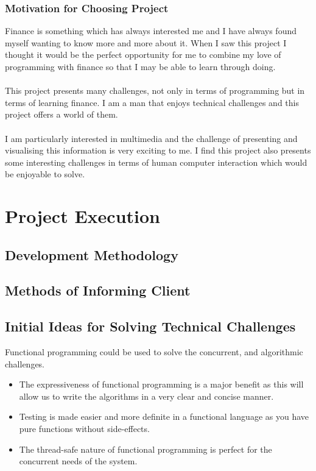 \documentclass{article}
\begin{document}
		\subsubsection{Motivation for Choosing Project}
		Finance is something which has always interested me and I have always found myself wanting to know more and more about it. When I saw this project I thought it would be the perfect opportunity for me to combine my love of programming with finance so that I may be able to learn through doing.\\\\
		This project presents many challenges, not only in terms of programming but in terms of learning finance. I am a man that enjoys technical challenges and this project offers a world of them.\\\\
		I am particularly interested in multimedia and the challenge of presenting and visualising this information is very exciting to me. I find this project also presents some interesting challenges in terms of human computer interaction which would be enjoyable to solve.

\cleardoublepage
    
\section{Project Execution}
	\subsection{Development Methodology}
	
	\subsection{Methods of Informing Client}
	
	\subsection{Initial Ideas for Solving Technical Challenges}
	Functional programming could be used to solve the concurrent, and algorithmic challenges.
	\begin{itemize}
		\item The expressiveness of functional programming is a major benefit as this will allow us to write the algorithms in a very clear and concise manner.
		\item Testing is made easier and more definite in a functional language as you have pure functions without side-effects.
		\item The thread-safe nature of functional programming is perfect for the concurrent needs of the system.
	\end{itemize}
\end{document}
